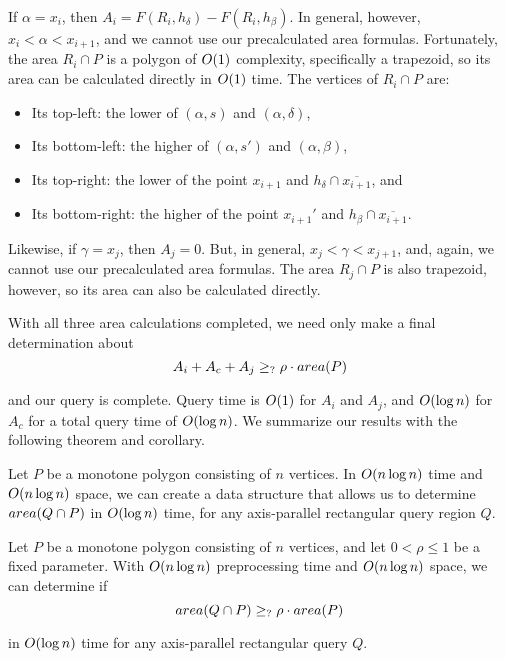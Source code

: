 If $\alpha = x_i$, then $A_i = F(R_i, h_\delta) - F(R_i, h_\beta)$. In general, however, $x_i < \alpha < x_{i+1}$, and we cannot use our precalculated area formulas. Fortunately, the area $R_i \cap P$ is a polygon of $O\!\left(1\right)$ complexity, specifically a trapezoid, so its area can be calculated directly in $O\!\left(1\right)$ time. The vertices of $R_i \cap P$ are:
\begin{itemize}
 \item Its top-left: the lower of $(\alpha, s)$ and $(\alpha, \delta)$,

 \item Its bottom-left: the higher of $(\alpha, s')$ and $(\alpha, \beta)$,

 \item Its top-right: the lower of the point $x_{i+1}$ and  $h_\delta \cap \overline{x_{i+1}}$, and

 \item Its bottom-right: the higher of the point $x_{i+1}'$ and $h_\beta \cap \overline{x_{i+1}}$.

\end{itemize}

Likewise, if $\gamma = x_j$, then $A_j = 0$. But, in general, $x_j < \gamma < x_{j+1}$, and, again, we cannot use our precalculated area formulas. The area $R_j \cap P$ is also trapezoid, however, so its area can also be calculated directly.

With all three area calculations completed, we need only make a final determination about 
\[
A_i + A_c + A_j \geq_? \rho \cdot area(P)
\]

\noindent 
and our query is complete. Query time is $O\!\left(1\right)$ for $A_i$ and $A_j$, and $O\!\left(\log{n}\right)$ for $A_c$ for a total query time of $O\!\left(\log{n}\right)$. We summarize our results with the following theorem and corollary.

\begin{theorem}
\label{th:monotonep:rect:area}
Let $P$ be a monotone polygon consisting of $n$ vertices. In $O\!\left(n \log{n}\right)$ time and $O\!\left(n \log{n}\right)$ space, we can create a data structure that allows us to determine $area(Q \cap P)$ in $O\!\left(\log{n}\right)$ time, for any axis-parallel rectangular query region $Q$.
\end{theorem}

\begin{corollary}
\label{cor:monotonep:rect:mp}
Let $P$ be a monotone polygon consisting of $n$ vertices, and let $0 < \rho \leq 1$ be a fixed parameter. With $O\!\left(n \log{n}\right)$ preprocessing time and $O\!\left(n \log{n}\right)$ space, we can determine if
\[ 
area(Q \cap P) \geq_{?} \rho \cdot area(P) 
\] 

\noindent in $O\!\left(\log{n}\right)$ time for any axis-parallel rectangular query $Q$.
\end{corollary}


